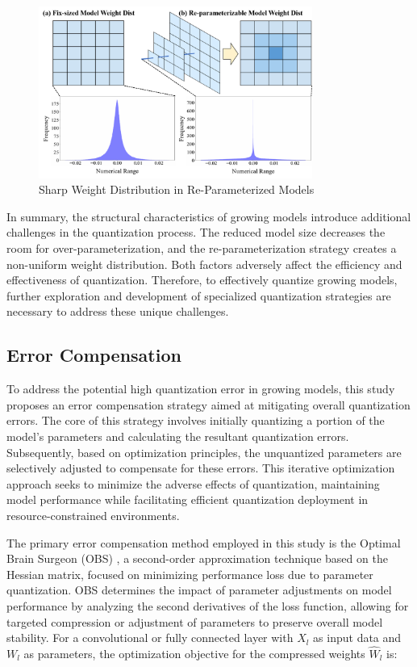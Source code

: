 \documentclass[preprint,12pt]{elsarticle}
\begin{document}
\begin{figure}[ht]
\centering
\includegraphics[width=0.8\textwidth]{imgs/rep.png}
\caption{Sharp Weight Distribution in Re-Parameterized Models}
\label{fig:sharp_weight_dist}
\end{figure}

In summary, the structural characteristics of growing models introduce additional challenges in the quantization process. The reduced model size decreases the room for over-parameterization, and the re-parameterization strategy creates a non-uniform weight distribution. Both factors adversely affect the efficiency and effectiveness of quantization. Therefore, to effectively quantize growing models, further exploration and development of specialized quantization strategies are necessary to address these unique challenges.

\subsection{Error Compensation}

To address the potential high quantization error in growing models, this study proposes an error compensation strategy aimed at mitigating overall quantization errors. The core of this strategy involves initially quantizing a portion of the model's parameters and calculating the resultant quantization errors. Subsequently, based on optimization principles, the unquantized parameters are selectively adjusted to compensate for these errors. This iterative optimization approach seeks to minimize the adverse effects of quantization, maintaining model performance while facilitating efficient quantization deployment in resource-constrained environments.

The primary error compensation method employed in this study is the Optimal Brain Surgeon (OBS) \cite{obs}, a second-order approximation technique based on the Hessian matrix, focused on minimizing performance loss due to parameter quantization. OBS determines the impact of parameter adjustments on model performance by analyzing the second derivatives of the loss function, allowing for targeted compression or adjustment of parameters to preserve overall model stability. For a convolutional or fully connected layer with \(X_l\) as input data and \(W_l\) as parameters, the optimization objective for the compressed weights \(\hat{W}_l\) is:
\end{document}
